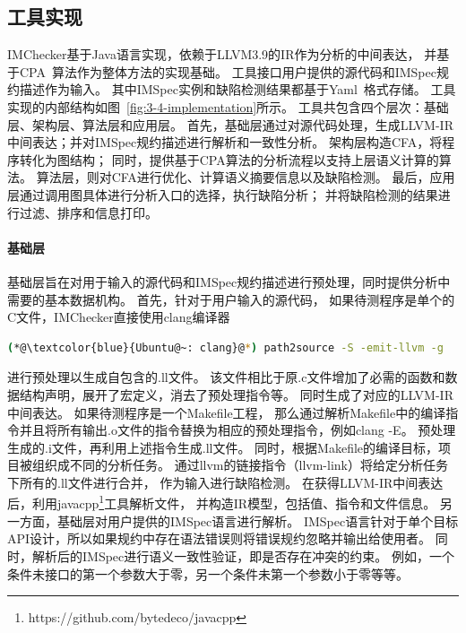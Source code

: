 \subsection{工具实现}
IMChecker基于Java语言实现，依赖于LLVM3.9的IR作为分析的中间表达，
并基于CPA~\cite{07-cav-cpachecker}算法作为整体方法的实现基础。
工具接口用户提供的源代码和IMSpec规约描述作为输入。
其中IMSpec实例和缺陷检测结果都基于Yaml~\cite{yaml}格式存储。
工具实现的内部结构如图~\ref{fig:3-4-implementation}所示。
工具共包含四个层次：基础层、架构层、算法层和应用层。
首先，基础层通过对源代码处理，生成LLVM-IR中间表达；并对IMSpec规约描述进行解析和一致性分析。
架构层构造CFA，将程序转化为图结构；
同时，提供基于CPA算法的分析流程以支持上层语义计算的算法。
算法层，则对CFA进行优化、计算语义摘要信息以及缺陷检测。
最后，应用层通过调用图具体进行分析入口的选择，执行缺陷分析；
并将缺陷检测的结果进行过滤、排序和信息打印。

\paragraph{基础层}
基础层旨在对用于输入的源代码和IMSpec规约描述进行预处理，同时提供分析中需要的基本数据机构。
首先，针对于用户输入的源代码，
如果待测程序是单个的C文件，IMChecker直接使用clang编译器
\begin{lstlisting}[language={bash},
basicstyle=\linespread{0.8}\listingsfont,
numbers=none,
xleftmargin=.25\textwidth]
(*@\textcolor{blue}{Ubuntu@~: clang}@*) path2source -S -emit-llvm -g
\end{lstlisting}
进行预处理以生成自包含的.ll文件。
该文件相比于原.c文件增加了必需的函数和数据结构声明，展开了宏定义，消去了预处理指令等。
同时生成了对应的LLVM-IR中间表达。
如果待测程序是一个Makefile工程，
那么通过解析Makefile中的编译指令并且将所有输出.o文件的指令替换为相应的预处理指令，例如clang -E。
预处理生成的.i文件，再利用上述指令生成.ll文件。
同时，根据Makefile的编译目标，项目被组织成不同的分析任务。
通过llvm的链接指令（llvm-link）将给定分析任务下所有的.ll文件进行合并，
作为输入进行缺陷检测。
在获得LLVM-IR中间表达后，利用javacpp\footnote{https://github.com/bytedeco/javacpp}工具解析文件，
并构造IR模型，包括值、指令和文件信息。
另一方面，基础层对用户提供的IMSpec语言进行解析。
IMSpec语言针对于单个目标API设计，所以如果规约中存在语法错误则将错误规约忽略并输出给使用者。
同时，解析后的IMSpec进行语义一致性验证，即是否存在冲突的约束。
例如，一个条件未接口的第一个参数大于零，另一个条件未第一个参数小于零等等。

